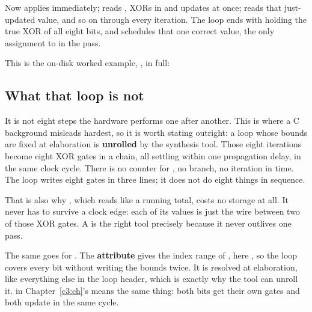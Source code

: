 \noindent Now  applies immediately;  reads , XORs in
 and updates  at once;  reads that just-updated value, and so on
through every iteration. The loop ends with  holding the true XOR of all eight bits, and
 schedules that one correct value, the only assignment to  in
the pass.

This is the on-disk worked example, , in full:


\subsection{What that loop is not}
\label{c5:loopnot}
It is not eight steps the hardware performs one after another. This is where a C background
misleads hardest, so it is worth stating outright: a  loop whose bounds are fixed at
elaboration is \textbf{unrolled} by the synthesis tool. Those eight iterations become eight XOR
gates in a chain, all settling within one propagation delay, in the same clock cycle. There is no
counter for , no branch, no iteration in time. The loop writes eight gates in three lines;
it does not do eight things in sequence.

That is also why , which reads like a running total, costs no storage at all. It never has
to survive a clock edge: each of its values is just the wire between two of those XOR gates. A
 is the right tool precisely because it never outlives one pass.

The same goes for . The  \textbf{attribute} gives the index range of
, here , so the loop covers every bit without writing the bounds twice.
It is resolved at elaboration, like everything else in the loop header, which is exactly why the
tool can unroll it.  in Chapter~\ref{c3:ch}'s 
means the same thing: both bits get their own gates and both update in the same cycle.

